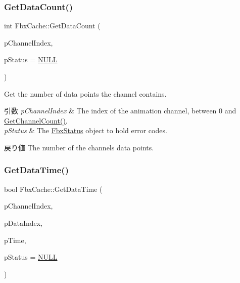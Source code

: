 \subsubsection{\texorpdfstring{Get\+Data\+Count()}{GetDataCount()}}
{\footnotesize\ttfamily int Fbx\+Cache\+::\+Get\+Data\+Count (\begin{DoxyParamCaption}\item[{int}]{p\+Channel\+Index,  }\item[{\hyperlink{class_fbx_status}{Fbx\+Status} $\ast$}]{p\+Status = {\ttfamily \hyperlink{fbxarch_8h_a070d2ce7b6bb7e5c05602aa8c308d0c4}{N\+U\+LL}} }\end{DoxyParamCaption})}

Get the number of data points the channel contains. 
\begin{DoxyParams}{引数}
{\em p\+Channel\+Index} & The index of the animation channel, between 0 and \hyperlink{class_fbx_cache_a1e2a07637eec39ae1eefb85fa29bc552}{Get\+Channel\+Count()}. \\
\hline
{\em p\+Status} & The \hyperlink{class_fbx_status}{Fbx\+Status} object to hold error codes. \\
\hline
\end{DoxyParams}
\begin{DoxyReturn}{戻り値}
The number of the channel\textquotesingle{}s data points. 
\end{DoxyReturn}
\mbox{\label{class_fbx_cache_a75e249b339bf5a2b1d4f713ee6697e2a}} 
\subsubsection{\texorpdfstring{Get\+Data\+Time()}{GetDataTime()}}
{\footnotesize\ttfamily bool Fbx\+Cache\+::\+Get\+Data\+Time (\begin{DoxyParamCaption}\item[{int}]{p\+Channel\+Index,  }\item[{unsigned int}]{p\+Data\+Index,  }\item[{\hyperlink{class_fbx_time}{Fbx\+Time} \&}]{p\+Time,  }\item[{\hyperlink{class_fbx_status}{Fbx\+Status} $\ast$}]{p\+Status = {\ttfamily \hyperlink{fbxarch_8h_a070d2ce7b6bb7e5c05602aa8c308d0c4}{N\+U\+LL}} }\end{DoxyParamCaption})}


